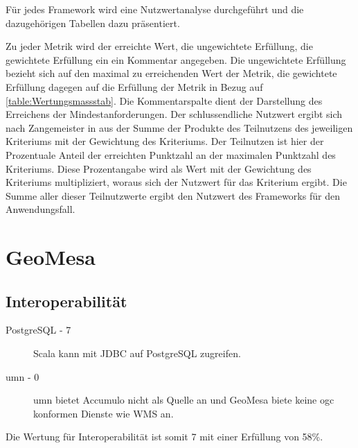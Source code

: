 Für jedes Framework wird eine Nutzwertanalyse durchgeführt und die dazugehörigen Tabellen dazu präsentiert.

Zu jeder Metrik wird der erreichte Wert, die ungewichtete Erfüllung, die gewichtete Erfüllung ein ein Kommentar angegeben.
Die ungewichtete Erfüllung bezieht sich auf den maximal zu erreichenden Wert der Metrik, die gewichtete Erfüllung dagegen auf die Erfüllung der Metrik in Bezug auf \ref{table:Wertungsmassstab}.
Die Kommentarspalte dient der Darstellung des Erreichens der Mindestanforderungen.
Der schlussendliche Nutzwert ergibt sich nach Zangemeister in \cite{website:nutzwertanalyse} aus der Summe der Produkte des Teilnutzens des jeweiligen Kriteriums mit der Gewichtung des Kriteriums.
Der Teilnutzen ist hier der Prozentuale Anteil der erreichten Punktzahl an der maximalen Punktzahl des Kriteriums.
Diese Prozentangabe wird als Wert mit der Gewichtung des Kriteriums multipliziert, woraus sich der Nutzwert für das Kriterium ergibt.
Die Summe aller dieser Teilnutzwerte ergibt den Nutzwert des Frameworks für den Anwendungsfall.

\section{GeoMesa}

\subsection{Interoperabilität}
\begin{description}
\item[PostgreSQL - 7] Scala  kann mit JDBC auf PostgreSQL zugreifen.
\item[\Gls{umn} - 0] \Gls{umn} bietet Accumulo nicht als Quelle an und GeoMesa biete keine \Gls{ogc} konformen Dienste wie WMS an.
\end{description}
Die Wertung für Interoperabilität ist somit 7 mit einer Erfüllung von 58\%.

